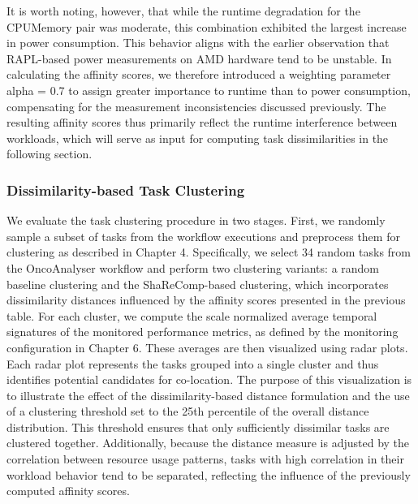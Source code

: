 It is worth noting, however, that while the runtime degradation for the CPUMemory pair was moderate, this combination exhibited the largest increase in power consumption. This behavior aligns with the earlier observation that RAPL-based power measurements on AMD hardware tend to be unstable. In calculating the affinity scores, we therefore introduced a weighting parameter alpha = 0.7 to assign greater importance to runtime than to power consumption, compensating for the measurement inconsistencies discussed previously. The resulting affinity scores thus primarily reflect the runtime interference between workloads, which will serve as input for computing task dissimilarities in the following section.

\subsubsection{Dissimilarity-based Task Clustering}
\label{sec:evaluation_task_consolidation}


We evaluate the task clustering procedure in two stages. First, we randomly sample a subset of tasks from the workflow executions and preprocess them for clustering as described in Chapter 4. Specifically, we select 34 random tasks from the OncoAnalyser workflow and perform two clustering variants: a random baseline clustering and the ShaReComp-based clustering, which incorporates dissimilarity distances influenced by the affinity scores presented in the previous table.
For each cluster, we compute the scale normalized average temporal signatures of the monitored performance metrics, as defined by the monitoring configuration in Chapter 6. These averages are then visualized using radar plots. Each radar plot represents the tasks grouped into a single cluster and thus identifies potential candidates for co-location. The purpose of this visualization is to illustrate the effect of the dissimilarity-based distance formulation and the use of a clustering threshold set to the 25th percentile of the overall distance distribution. This threshold ensures that only sufficiently dissimilar tasks are clustered together.
Additionally, because the distance measure is adjusted by the correlation between resource usage patterns, tasks with high correlation in their workload behavior tend to be separated, reflecting the influence of the previously computed affinity scores.

